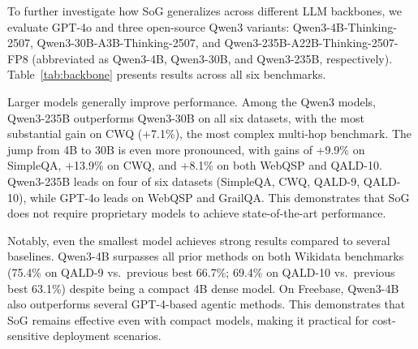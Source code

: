 \documentclass[sigconf]{acmart}
\begin{document}
To further investigate how SoG generalizes across different LLM backbones, we evaluate GPT-4o and three open-source Qwen3 variants: Qwen3-4B-Thinking-2507, Qwen3-30B-A3B-Thinking-2507, and Qwen3-235B-A22B-Thinking-2507-FP8 (abbreviated as Qwen3-4B, Qwen3-30B, and Qwen3-235B, respectively). Table~\ref{tab:backbone} presents results across all six benchmarks.



\begin{table}[t]
\centering
\caption{Performance of SoG using different backbone models: open-source Qwen3 models and  proprietary model GPT-4o. Bold indicates best per dataset.}
\label{tab:backbone}
\end{table}

Larger models generally improve performance. Among the Qwen3 models, Qwen3-235B outperforms Qwen3-30B on all six datasets, with the most substantial gain on CWQ (+7.1\%), the most complex multi-hop benchmark. The jump from 4B to 30B is even more pronounced, with gains of +9.9\% on SimpleQA, +13.9\% on CWQ, and +8.1\% on both WebQSP and QALD-10. Qwen3-235B leads on four of six datasets (SimpleQA, CWQ, QALD-9, QALD-10), while GPT-4o leads on WebQSP and GrailQA. This demonstrates that SoG does not require proprietary models to achieve state-of-the-art performance.

Notably, even the smallest model achieves strong results compared to several baselines. Qwen3-4B surpasses all prior methods on both Wikidata benchmarks (75.4\% on QALD-9 vs.\ previous best 66.7\%; 69.4\% on QALD-10 vs.\ previous best 63.1\%) despite being a compact 4B dense model. On Freebase, Qwen3-4B also outperforms several GPT-4-based agentic methods. This demonstrates that SoG remains effective even with compact models, making it practical for cost-sensitive deployment scenarios. 
\end{document}
